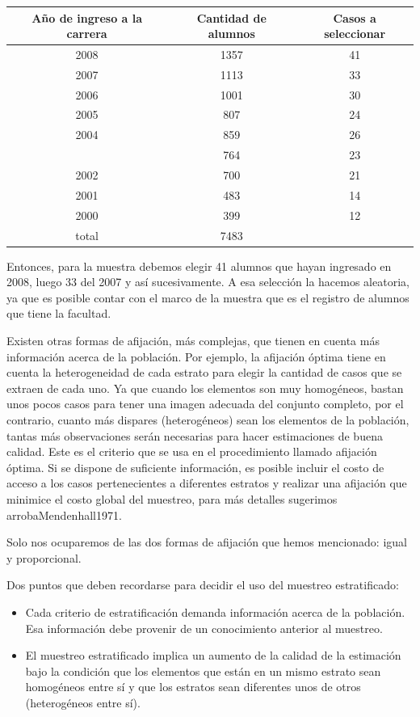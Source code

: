 \documentclass[]{book}
\begin{document}
\begin{table}[H]
\centering
\begin{tabular}{ccc}
\toprule
Año de ingreso a la carrera & Cantidad de alumnos & Casos a seleccionar\\
\midrule
\rowcolor{gray!6}  2008 & 1357 & 41\\
2007 & 1113 & 33\\
\rowcolor{gray!6}  2006 & 1001 & 30\\
2005 & 807 & 24\\
\rowcolor{gray!6}  2004 & 859 & 26\\
\addlinespace
2003 & 764 & 23\\
\rowcolor{gray!6}  2002 & 700 & 21\\
2001 & 483 & 14\\
\rowcolor{gray!6}  2000 & 399 & 12\\
total & 7483 & \\
\bottomrule
\end{tabular}
\end{table}

Entonces, para la muestra debemos elegir 41 alumnos que hayan ingresado
en 2008, luego 33 del 2007 y así sucesivamente. A esa selección la
hacemos aleatoria, ya que es posible contar con el marco de la muestra
que es el registro de alumnos que tiene la facultad.

Existen otras formas de afijación, más complejas, que tienen en cuenta
más información acerca de la población. Por ejemplo, la afijación óptima
tiene en cuenta la heterogeneidad de cada estrato para elegir la
cantidad de casos que se extraen de cada uno. Ya que cuando los
elementos son muy homogéneos, bastan unos pocos casos para tener una
imagen adecuada del conjunto completo, por el contrario, cuanto más
dispares (heterogéneos) sean los elementos de la población, tantas más
observaciones serán necesarias para hacer estimaciones de buena calidad.
Este es el criterio que se usa en el procedimiento llamado afijación
óptima. Si se dispone de suficiente información, es posible incluir el
costo de acceso a los casos pertenecientes a diferentes estratos y
realizar una afijación que minimice el costo global del muestreo, para
más detalles sugerimos arrobaMendenhall1971.

Solo nos ocuparemos de las dos formas de afijación que hemos mencionado: igual y proporcional.

Dos puntos que deben recordarse para decidir el uso del muestreo
estratificado:

\begin{itemize}
\item
  Cada criterio de estratificación demanda información acerca de la
  población. Esa información debe provenir de un conocimiento anterior al
  muestreo.
\item
  El muestreo estratificado implica un aumento de la calidad de la
  estimación bajo la condición que los elementos que están en un mismo
  estrato sean homogéneos entre sí y que los estratos sean diferentes unos de otros (heterogéneos entre sí).
\end{itemize}
\end{document}

